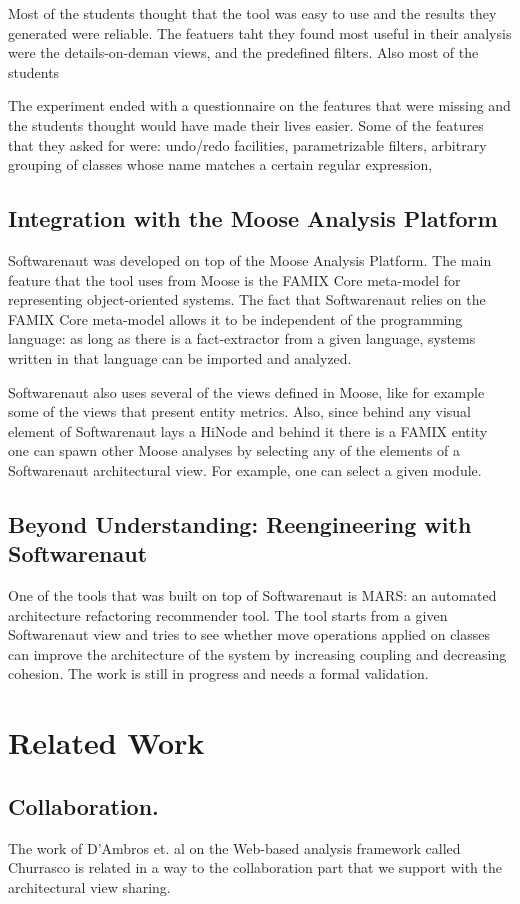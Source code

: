 \documentclass[preprint,12pt]{elsarticle}
\begin{document}
Most of the students thought that the tool was easy to use and the results they generated were reliable. The featuers taht they found most useful in their analysis were the details-on-deman views, and the predefined filters. Also most of the students 

The experiment ended with a questionnaire on the features that were missing and the students thought would have made their lives easier. Some of the features that they asked for were: undo/redo facilities, parametrizable filters, arbitrary grouping of classes whose name matches a certain regular expression, 

\subsection {Integration with the Moose Analysis Platform}
Softwarenaut was developed on top of the Moose Analysis Platform. The main feature that the tool uses from Moose is the FAMIX Core meta-model for representing object-oriented systems. The fact that Softwarenaut relies on the FAMIX Core meta-model allows it to be independent of the programming language: as long as there is a fact-extractor from a given language, systems written in that language can be imported and analyzed. 

Softwarenaut also uses several of the views defined in Moose, like for example some of the views that present entity metrics. Also, since behind any visual element of Softwarenaut lays a HiNode and behind it there is a FAMIX entity one can spawn other Moose analyses by selecting any of the elements of a Softwarenaut architectural view. For example, one can select a given module.


\subsection {Beyond Understanding: Reengineering with Softwarenaut}
One of the tools that was built on top of Softwarenaut is MARS: an automated architecture refactoring recommender tool. The tool starts from a given Softwarenaut view and tries to see whether move operations applied on classes can improve the architecture of the system by increasing coupling and decreasing cohesion. The work is still in progress and needs a formal validation. 


\section {Related Work}
\subsection {Collaboration.} The work of D’Ambros et. al on the Web-based analysis framework called Churrasco is related in a way to the collaboration part that we support with the architectural view sharing. 
\end{document}
